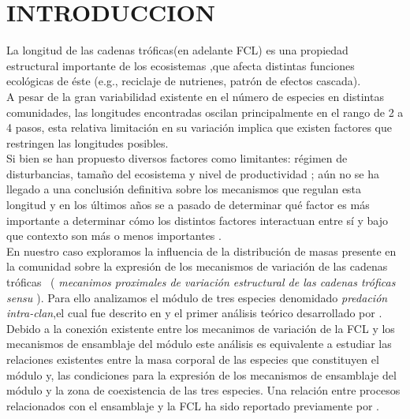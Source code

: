 \section{INTRODUCCION}

La longitud de las cadenas tr\'oficas(en adelante FCL) es una propiedad estructural importante de los ecosistemas ,que afecta distintas funciones ecol\'ogicas de \'este (e.g., reciclaje de nutrienes, patr\'on de efectos cascada).\\
A pesar de la gran variabilidad existente en el n\'umero de especies en distintas comunidades, las longitudes encontradas oscilan principalmente en el rango de 2 a 4 pasos\citep{elton1927animal,pimm1978feeding,yodzis1981structure,williams2004}, esta relativa limitaci\'on en su variaci\'on implica que existen factores que restringen las longitudes posibles.\\
Si bien se han propuesto diversos factores como limitantes: r\'egimen de disturbancias, tama\~no del ecosistema y nivel de productividad \citep{post2002long,takimoto2013environmental}; a\'un no se ha llegado a una conclusi\'on definitiva sobre los mecanismos que regulan esta longitud \citep{sterner1997enigma,takimoto2013environmental} y en los \'ultimos a\~nos se a pasado de determinar qu\'e factor es m\'as importante a determinar c\'omo los distintos factores interactuan entre s\'i y bajo que contexto son m\'as o menos importantes \citep{post2002long}.\\

En nuestro caso exploramos la influencia de la distribuci\'on de masas presente en la comunidad sobre la expresi\'on de los mecanismos de variaci\'on de las cadenas tr\'oficas \ ( \emph{mecanimos proximales de variaci\'on estructural de las cadenas tr\'oficas sensu \cite{TP2007proximate}}). Para ello analizamos el m\'odulo de tres especies denomidado \emph{predaci\'on intra-clan},el cual fue descrito en \cite{polis1989ecology} y el primer an\'alisis te\'orico desarrollado por \cite{holt1997theoretical}. Debido a la conexi\'on existente entre los mecanimos de variaci\'on de la FCL y los mecanismos de ensamblaje del m\'odulo\citep{TP2007proximate} este an\'alisis es equivalente a estudiar las relaciones existentes entre la masa corporal de las especies que constituyen el m\'odulo y, las condiciones para la expresi\'on de los mecanismos de ensamblaje del m\'odulo y la zona de coexistencia de las tres especies. Una relaci\'on entre procesos relacionados con el ensamblaje y la FCL ha sido reportado previamente por \citet{holt2002food}.\\

